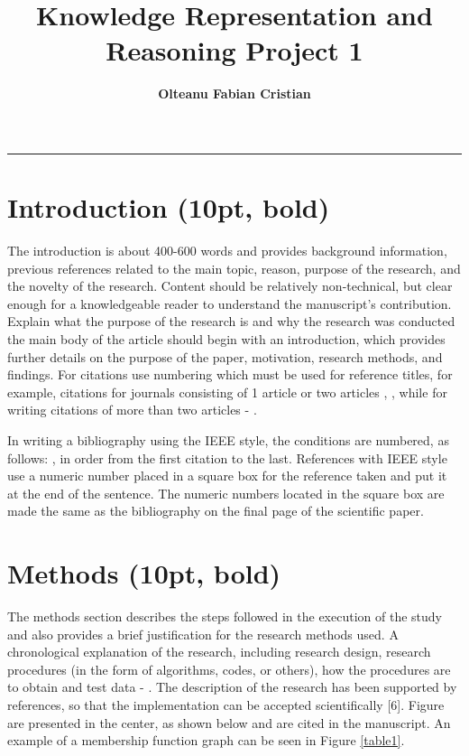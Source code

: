 \documentclass{article}
\author{\textbf{Olteanu Fabian Cristian}}
\affil{FMI, AI Master, Year 1
}
\title{\textbf{\huge Knowledge Representation and Reasoning Project 1}}
\date{}
\begin{document}
\pagestyle{headings}	
\newpage
\setcounter{page}{1}
\renewcommand{\thepage}{\arabic{page}}


	
	
\setlength{\parskip}{0.5em}
	
\maketitle
	
\noindent\rule{15cm}{0.4pt}

\section{Introduction (10pt, bold)}
The introduction is about 400-600 words and provides background information, previous references related to the main topic, reason, purpose of the research, and the novelty of the research.  Content should be relatively non-technical, but clear enough for a knowledgeable reader to understand the manuscript’s contribution. Explain what the purpose of the research is and why the research was conducted the main body of the article should begin with an introduction, which provides further details on the purpose of the paper, motivation, research methods, and findings. For citations use numbering which must be used for reference titles, for example, citations for journals consisting of 1 article  \cite{Septiawan1} or two articles \cite{Septiawan2}, \cite{Lucy}, while for writing citations of more than two articles \cite{Gingold} - \cite{Morikawa}.

In writing a bibliography using the IEEE style, the conditions are numbered, as follows: \cite{Septiawan1}, in order from the first citation to the last. References with IEEE style use a numeric number placed in a square box for the reference taken and put it at the end of the sentence. The numeric numbers located in the square box are made the same as the bibliography on the final page of the scientific paper.

\section{Methods (10pt, bold)}
The methods section describes the steps followed in the execution of the study and also provides a brief justification for the research methods used. A chronological explanation of the research, including research design, research procedures (in the form of algorithms, codes, or others), how the procedures are to obtain and test data \cite{Lo} - \cite{Hang}. The description of the research has been supported by references, so that the implementation can be accepted scientifically [6]. Figure are presented in the center, as shown below and are cited in the manuscript. An example of a membership function graph can be seen in Figure \ref{table1}.
\end{document}
